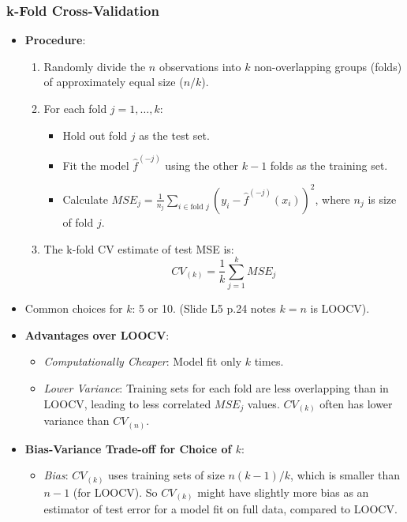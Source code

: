 \documentclass[12pt,a4paper]{article}
\begin{document}
\begin{itemize}
    \subsubsection{k-Fold Cross-Validation}
        \begin{itemize}
            \item \textbf{Procedure}:
                \begin{enumerate}
                    \item Randomly divide the $n$ observations into $k$ non-overlapping groups (folds) of approximately equal size ($n/k$).
                    \item For each fold $j=1, \dots, k$:
                        \begin{itemize}
                            \item Hold out fold $j$ as the test set.
                            \item Fit the model $\hat{f}^{(-j)}$ using the other $k-1$ folds as the training set.
                            \item Calculate $MSE_j = \frac{1}{n_j} \sum_{i \in \text{fold }j} (y_i - \hat{f}^{(-j)}(x_i))^2$, where $n_j$ is size of fold $j$.
                        \end{itemize}
                    \item The k-fold CV estimate of test MSE is:
                        $$ CV_{(k)} = \frac{1}{k} \sum_{j=1}^{k} MSE_j $$
                \end{enumerate}
            \item Common choices for $k$: 5 or 10. (Slide L5 p.24 notes $k=n$ is LOOCV).
            \item \textbf{Advantages over LOOCV}:
                \begin{itemize}
                    \item \textit{Computationally Cheaper}: Model fit only $k$ times.
                    \item \textit{Lower Variance}: Training sets for each fold are less overlapping than in LOOCV, leading to less correlated $MSE_j$ values. $CV_{(k)}$ often has lower variance than $CV_{(n)}$.
                \end{itemize}
            \item \textbf{Bias-Variance Trade-off for Choice of $k$}:
                \begin{itemize}
                    \item \textit{Bias}: $CV_{(k)}$ uses training sets of size $n(k-1)/k$, which is smaller than $n-1$ (for LOOCV). So $CV_{(k)}$ might have slightly more bias as an estimator of test error for a model fit on full data, compared to LOOCV.

\end{itemize}
\end{itemize}
\end{itemize}
\end{document}
